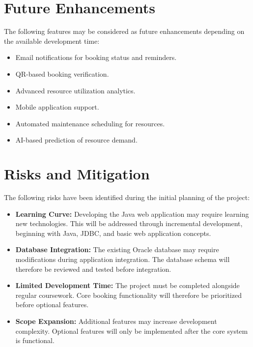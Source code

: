 \documentclass[12pt,a4paper]{article}
\begin{document}

\section{Future Enhancements}

The following features may be considered as future enhancements depending on the available development time:

\begin{itemize}
    \item Email notifications for booking status and reminders.
    \item QR-based booking verification.
    \item Advanced resource utilization analytics.
    \item Mobile application support.
    \item Automated maintenance scheduling for resources.
    \item AI-based prediction of resource demand.
\end{itemize}

\section{Risks and Mitigation}

The following risks have been identified during the initial
planning of the project:

\begin{itemize}

    \item \textbf{Learning Curve:}
    Developing the Java web application may require learning new
    technologies. This will be addressed through incremental
    development, beginning with Java, JDBC, and basic web
    application concepts.

    \item \textbf{Database Integration:}
    The existing Oracle database may require modifications during
    application integration. The database schema will therefore be
    reviewed and tested before integration.

    \item \textbf{Limited Development Time:}
    The project must be completed alongside regular coursework.
    Core booking functionality will therefore be prioritized before
    optional features.

    \item \textbf{Scope Expansion:}
    Additional features may increase development complexity.
    Optional features will only be implemented after the core
    system is functional.

\end{itemize}
\end{document}
